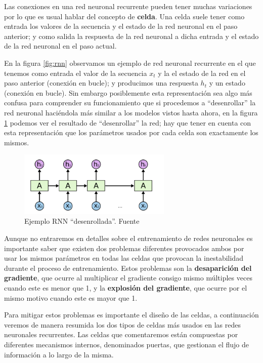 Las conexiones en una red neuronal recurrente pueden tener muchas variaciones por lo que es usual hablar del concepto de \textbf{celda}. Una celda suele tener como entrada los valores de la secuencia y el estado de la red neuronal en el paso anterior; y como salida la respuesta de la red neuronal a dicha entrada y el estado de la red neuronal en el paso actual. 



En la figura \ref{fig:rnn} observamos un ejemplo de red neuronal recurrente en el que tenemos como entrada el valor de la secuencia $x_{t}$ y la el estado de la red en el paso anterior (conexión en bucle); y producimos una respuesta $h_{t}$ y un estado (conexión en bucle). Sin embargo posiblemente esta representación sea algo más confusa para comprender su funcionamiento que si procedemos a ``desenrollar'' la red neuronal haciéndola más similar a los modelos vistos hasta ahora, en la figura \ref{fig:rnn2} podemos ver el resultado de ``desenrollar'' la red; hay que tener en cuenta con esta representación que los parámetros usados por cada celda son exactamente los mismos.

\begin{figure}[!ht]
	\centering
	\includegraphics[width=0.65\textwidth]{images/arte/rnn2}
	\caption{Ejemplo RNN ``desenrollada''. Fuente \cite{colahblog}}
	\label{fig:rnn2}
\end{figure}



Aunque no entraremos en detalles sobre el entrenamiento de redes neuronales es importante saber que existen dos problemas diferentes provocados ambos por usar los mismos parámetros en todas las celdas que provocan la inestabilidad durante el proceso de entrenamiento. Estos problemas son la \textbf{desaparición del gradiente}, que ocurre al multiplicar el gradiente consigo mismo múltiples veces cuando este es menor que 1, y la \textbf{explosión del gradiente}, que ocurre por el mismo motivo cuando este es mayor que 1. 

Para mitigar estos problemas es importante el diseño de las celdas, a continuación veremos de manera resumida los dos tipos de celdas más usados en las redes neuronales recurrentes. Las celdas que comentaremos están compuestas por diferentes mecanismos internos, denominados puertas, que gestionan el flujo de información a lo largo de la misma. 


